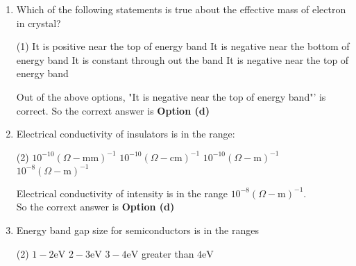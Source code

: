 \begin{enumerate}
 \begin{tasks}(1)
	\task[\textbf{a.}] $n$-type semiconductors are obtained by doping phosphorus into silicon
	\task[\textbf{b.}]The conductivity of all semiconductors always increases with temperature
	\task[\textbf{c.}]$p$-type semiconductors are obtained by doping boron into silicon
	\task[\textbf{d.}] Intrinsic semiconductors are insulators at $T=0{ }^{\circ} \mathrm{K}$
\end{tasks}
\begin{answer}
Out of the above options, the option (b) the conductivity of all semiconductors always increases with temperature is false.\\
	So the corrext answer is \textbf{Option (b)}
\end{answer}
	\item Which of the following statements is true about the effective mass of electron in crystal?
	 \begin{tasks}(1)
		\task[\textbf{a.}]It is positive near the top of energy band 
		\task[\textbf{b.}]It is negative near the bottom of energy band
		\task[\textbf{c.}]It is constant through out the band
		\task[\textbf{d.}] It is negative near the top of energy band
	\end{tasks}
	\begin{answer}
	Out of the above options, "It is negative near the top of energy band"' is correct.
	So the corrext answer is \textbf{Option (d)}
	\end{answer}
\item Electrical conductivity of insulators is in the range:
	 \begin{tasks}(2)
		\task[\textbf{a.}]$10^{-10}(\Omega-\mathrm{mm})^{-1}$
		\task[\textbf{b.}]$10^{-10}(\Omega-\mathrm{cm})^{-1}$
		\task[\textbf{c.}] $10^{-10}(\Omega-\mathrm{m})^{-1}$
		\task[\textbf{d.}] $10^{-8}(\Omega-\mathrm{m})^{-1}$
	\end{tasks}
	\begin{answer}
	Electrical conductivity of intensity is in the range $10^{-8}(\Omega-\mathrm{m})^{-1}$. \\
	So the corrext answer is \textbf{Option (d)}
	\end{answer}
	\item Energy band gap size for semiconductors is in the ranges
	 \begin{tasks}(2)
		\task[\textbf{a.}]$1-2 \mathrm{eV}$
		\task[\textbf{b.}]$2-3 \mathrm{eV}$
		\task[\textbf{c.}]$3-4 \mathrm{eV}$
		\task[\textbf{d.}]  greater than $4 \mathrm{eV}$
	\end{tasks}

\end{enumerate}
